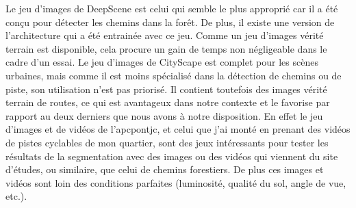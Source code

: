 ﻿\noindent Le jeu d'images de DeepScene est celui qui semble le plus approprié car il a été conçu pour détecter les chemins dans la forêt. De plus, il existe une version de l'architecture qui a été entrainée avec ce jeu. Comme un jeu d'images vérité terrain est disponible, cela procure un gain de temps non négligeable dans le cadre d'un essai. Le jeu d'images de CityScape est complet pour les scènes urbaines, mais comme il est moins spécialisé dans la détection de chemins ou de piste, son utilisation n'est pas priorisé. Il contient toutefois des images vérité terrain de routes, ce qui est avantageux dans notre contexte et le favorise par rapport au deux derniers que nous avons à notre disposition. En effet le jeu d'images et de vidéos de l'\acrshort{apcpontjc}, et celui que j'ai monté en prenant des vidéos de pistes cyclables de mon quartier, sont des jeux intéressants pour tester les résultats de la segmentation avec des images ou des vidéos qui viennent du site d'études, ou similaire, que celui de chemins forestiers. De plus ces images et vidéos sont loin des conditions parfaites (luminosité, qualité du sol, angle de vue, etc.).
